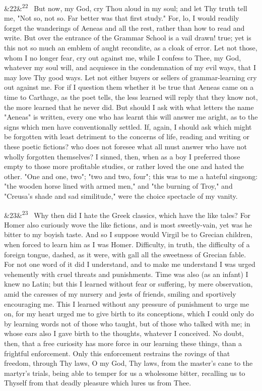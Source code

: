 \documentclass[12pt]{article}
\newcommand{\para}[1][]{\par\noindent\ifx&#1&\else\textsuperscript{\footnotesize #1}~\fi}
\begin{document}
\para[22] But now, my God, cry Thou aloud in my soul; and let Thy truth tell me, "Not so, not so. Far better was that first study." For, lo, I would readily forget the wanderings of Aeneas and all the rest, rather than how to read and write. But over the entrance of the Grammar School is a vail drawn! true; yet is this not so much an emblem of aught recondite, as a cloak of error. Let not those, whom I no longer fear, cry out against me, while I confess to Thee, my God, whatever my soul will, and acquiesce in the condemnation of my evil ways, that I may love Thy good ways. Let not either buyers or sellers of grammar-learning cry out against me. For if I question them whether it be true that Aeneas came on a time to Carthage, as the poet tells, the less learned will reply that they know not, the more learned that he never did. But should I ask with what letters the name "Aeneas" is written, every one who has learnt this will answer me aright, as to the signs which men have conventionally settled. If, again, I should ask which might be forgotten with least detriment to the concerns of life, reading and writing or these poetic fictions? who does not foresee what all must answer who have not wholly forgotten themselves? I sinned, then, when as a boy I preferred those empty to those more profitable studies, or rather loved the one and hated the other. "One and one, two"; "two and two, four"; this was to me a hateful singsong: "the wooden horse lined with armed men," and "the burning of Troy," and "Creusa's shade and sad similitude," were the choice spectacle of my vanity.

\para[23] Why then did I hate the Greek classics, which have the like tales? For Homer also curiously wove the like fictions, and is most sweetly-vain, yet was he bitter to my boyish taste. And so I suppose would Virgil be to Grecian children, when forced to learn him as I was Homer. Difficulty, in truth, the difficulty of a foreign tongue, dashed, as it were, with gall all the sweetness of Grecian fable. For not one word of it did I understand, and to make me understand I was urged vehemently with cruel threats and punishments. Time was also (as an infant) I knew no Latin; but this I learned without fear or suffering, by mere observation, amid the caresses of my nursery and jests of friends, smiling and sportively encouraging me. This I learned without any pressure of punishment to urge me on, for my heart urged me to give birth to its conceptions, which I could only do by learning words not of those who taught, but of those who talked with me; in whose ears also I gave birth to the thoughts, whatever I conceived. No doubt, then, that a free curiosity has more force in our learning these things, than a frightful enforcement. Only this enforcement restrains the rovings of that freedom, through Thy laws, O my God, Thy laws, from the master's cane to the martyr's trials, being able to temper for us a wholesome bitter, recalling us to Thyself from that deadly pleasure which lures us from Thee.
\end{document}
